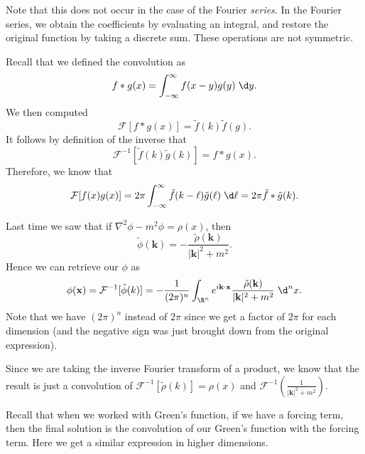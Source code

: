 \documentclass[a4paper]{article}
\begin{document}
Note that this does not occur in the case of the Fourier \emph{series}. In the Fourier series, we obtain the coefficients by evaluating an integral, and restore the original function by taking a discrete sum. These operations are not symmetric.

\begin{eg}
  Recall that we defined the convolution as
  \[
    f * g(x) = \int_{-\infty}^\infty f(x - y) g(y)\;\d y.
  \]
  We then computed
  \[
    \mathcal{F}[f * g(x)] = \tilde{f}(k) \tilde{f}(g).
  \]
  It follows by definition of the inverse that
  \[
    \mathcal{F}^{-1}[\tilde{f}(k) \tilde{g}(k)] = f * g(x).
  \]
  Therefore, we know that
  \[
    \mathcal{F}[f(x) g(x)] = 2\pi \int_{-\infty}^\infty \tilde{f}(k - \ell) \tilde{g}(\ell)\;\d \ell = 2\pi \tilde{f} * \tilde{g} (k).
  \]
\end{eg}

\begin{eg}
  Last time we saw that if $\nabla^2 \phi - m^2 \phi = \rho(x)$, then
  \[
    \tilde{\phi}(\mathbf{k}) = -\frac{\tilde{\rho}(\mathbf{k})}{|\mathbf{k}|^2 + m^2}.
  \]
  Hence we can retrieve our $\phi$ as
  \[
    \phi(\mathbf{x}) = \mathcal{F}^{-1}[\tilde{\phi}(k)] = -\frac{1}{(2\pi)^n} \int_{\R^n} e^{i\mathbf{k}\cdot \mathbf{x}} \frac{\tilde{\rho}(\mathbf{k})}{|\mathbf{k}|^2 + m^2}\;\d^n x.
  \]
  Note that we have $(2\pi)^n$ instead of $2\pi$ since we get a factor of $2\pi$ for each dimension (and the negative sign was just brought down from the original expression).

  Since we are taking the inverse Fourier transform of a product, we know that the result is just a convolution of $\mathcal{F}^{-1}[\tilde{\rho}(k)] = \rho(x)$ and $\mathcal{F}^{-1}\left(\frac{1}{|\mathbf{k}|^2 + m^2}\right)$.

  Recall that when we worked with Green's function, if we have a forcing term, then the final solution is the convolution of our Green's function with the forcing term. Here we get a similar expression in higher dimensions.
\end{eg}
\end{document}
